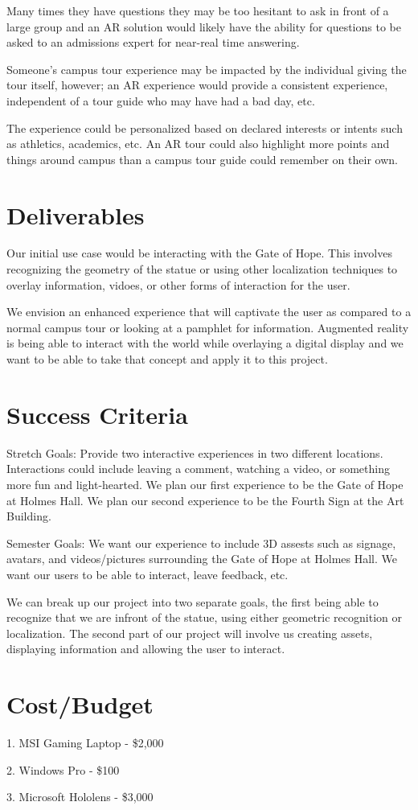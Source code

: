 \documentclass[titlepage]{article}
\begin{document}
Many times they have questions they may be too hesitant to ask in front of a large group and an AR solution would likely have the ability for questions to be asked to an admissions expert for near-real time answering.

Someone's campus tour experience may be impacted by the individual giving the tour itself, however; an AR experience would provide a consistent experience, independent of a tour guide who may have had a bad day, etc.

The experience could be personalized based on declared interests or intents such as athletics, academics, etc. An AR tour could also highlight more points and things around campus than a campus tour guide could remember on their own.

\section*{Deliverables}

Our initial use case would be interacting with the Gate of Hope. This involves recognizing the geometry of the statue or using other localization techniques to overlay information, vidoes, or other forms of interaction for the user.

We envision an enhanced experience that will captivate the user as compared to a normal campus tour or looking at a pamphlet for information. Augmented reality is being able to interact with the world while overlaying a digital display and we want to be able to take that concept and apply it to this project.

\section*{Success Criteria}

Stretch Goals: Provide two interactive experiences in two different locations. Interactions could include leaving a comment, watching a video, or something more fun and light-hearted. We plan our first experience to be the Gate of Hope at Holmes Hall. We plan our second experience to be the Fourth Sign at the Art Building.

Semester Goals: We want our experience to include 3D assests such as signage, avatars, and videos/pictures surrounding the Gate of Hope at Holmes Hall. We want our users to be able to interact, leave feedback, etc.

We can break up our project into two separate goals, the first being able to recognize that we are infront of the statue, using either geometric recognition or localization. The second part of our project will involve us creating assets, displaying information and allowing the user to interact.

\section*{Cost/Budget}

1. MSI Gaming Laptop - \$2,000

2. Windows Pro - \$100

3. Microsoft Hololens - \$3,000
\end{document}
